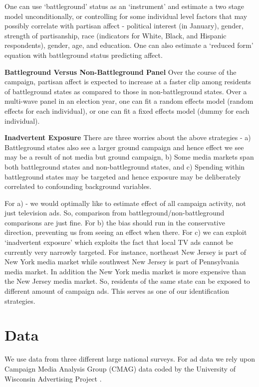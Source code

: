\documentclass[doc,fignum,noapacite]{apa}
\begin{document}
One can use `battleground' status as an `instrument' and estimate a two stage model unconditionally, or controlling for 
some individual level factors that may possibly correlate with partisan affect - political interest (in January), 
gender, strength of partisanship, race (indicators for White, Black, and Hispanic respondents), gender, age, and 
education. One can also estimate a `reduced form' equation with battleground status predicting affect. 

\textbf{Battleground Versus Non-Battleground Panel} Over the course of the campaign, partisan affect is expected to
increase at a faster clip among residents of battleground states as compared to those in non-battleground states. 
Over a multi-wave panel in an election year, one can fit a random effects model (random effects for each individual),
or one can fit a fixed effects model (dummy for each individual). 

\textbf{Inadvertent Exposure}
There are three worries about the above strategies - a) Battleground states also see a larger ground campaign and hence
effect we see may be a result of not media but ground campaign, b) Some media markets span both battleground states 
and non-battleground states, and c) Spending within battleground states may be targeted and hence exposure may be 
deliberately correlated to confounding background variables.

For a) - we would optimally like to estimate effect of all campaign activity, not just television ads. So, comparison
from battleground/non-battleground comparisons are just fine. For b) the bias should run in the conservative direction, 
preventing us from seeing an effect when there. For c) we can exploit `inadvertent exposure' which exploits the fact 
that local TV ads cannot be currently very narrowly targeted. For instance, northeast New Jersey is part of New York 
media market while southwest New Jersey is part of Pennsylvania media market. In addition the New York media market is 
more expensive than the New Jersey media market. So, residents of the same state can be exposed to different amount of 
campaign ads. This serves as one of our identification strategies.

\section{Data}
We use data from three different large national surveys. For ad data we rely upon Campaign Media Analysis Group (CMAG) 
data coded by the University of Wisconsin Advertising Project \cite {Goldstein2007}.
\end{document}

